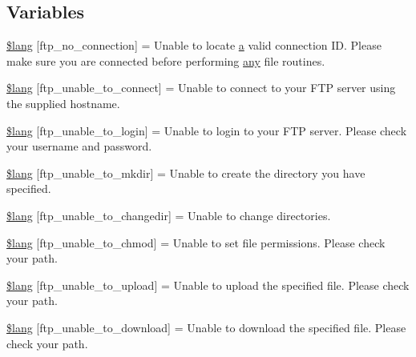 \subsection*{Variables}
\begin{DoxyCompactItemize}
\item 
\mbox{\hyperlink{ftp__lang_8php_af32ae700eb8c6446a6b393f025207123}{\$lang}} \mbox{[}\textquotesingle{}ftp\+\_\+no\+\_\+connection\textquotesingle{}\mbox{]} = \textquotesingle{}Unable to locate \mbox{\hyperlink{interfacea}{a}} valid connection I\+D. Please make sure you are connected before performing \mbox{\hyperlink{_functions_8php_aa950afcee01981fe0485ce00ff0e8e8c}{any}} file routines.\textquotesingle{}
\item 
\mbox{\hyperlink{ftp__lang_8php_a5a2916d207a12fc234432617f6bfe16c}{\$lang}} \mbox{[}\textquotesingle{}ftp\+\_\+unable\+\_\+to\+\_\+connect\textquotesingle{}\mbox{]} = \textquotesingle{}Unable to connect to your F\+TP server using the supplied hostname.\textquotesingle{}
\item 
\mbox{\hyperlink{ftp__lang_8php_ab8accd066e5113d6964f8a66bffadd2b}{\$lang}} \mbox{[}\textquotesingle{}ftp\+\_\+unable\+\_\+to\+\_\+login\textquotesingle{}\mbox{]} = \textquotesingle{}Unable to login to your F\+TP server. Please check your username and password.\textquotesingle{}
\item 
\mbox{\hyperlink{ftp__lang_8php_a1b9aef89edd203147bc526cad9cce4bf}{\$lang}} \mbox{[}\textquotesingle{}ftp\+\_\+unable\+\_\+to\+\_\+mkdir\textquotesingle{}\mbox{]} = \textquotesingle{}Unable to create the directory you have specified.\textquotesingle{}
\item 
\mbox{\hyperlink{ftp__lang_8php_a992dca1be963ab5d3ba070bfc2cd1cd3}{\$lang}} \mbox{[}\textquotesingle{}ftp\+\_\+unable\+\_\+to\+\_\+changedir\textquotesingle{}\mbox{]} = \textquotesingle{}Unable to change directories.\textquotesingle{}
\item 
\mbox{\hyperlink{ftp__lang_8php_a3329c4f515930936620f39a213dd3686}{\$lang}} \mbox{[}\textquotesingle{}ftp\+\_\+unable\+\_\+to\+\_\+chmod\textquotesingle{}\mbox{]} = \textquotesingle{}Unable to set file permissions. Please check your path.\textquotesingle{}
\item 
\mbox{\hyperlink{ftp__lang_8php_ae1f02f1304d517603128c96c70b7209b}{\$lang}} \mbox{[}\textquotesingle{}ftp\+\_\+unable\+\_\+to\+\_\+upload\textquotesingle{}\mbox{]} = \textquotesingle{}Unable to upload the specified file. Please check your path.\textquotesingle{}
\item 
\mbox{\hyperlink{ftp__lang_8php_ab5260548d1d2c2964dd03977903aff36}{\$lang}} \mbox{[}\textquotesingle{}ftp\+\_\+unable\+\_\+to\+\_\+download\textquotesingle{}\mbox{]} = \textquotesingle{}Unable to download the specified file. Please check your path.\textquotesingle{}

\end{DoxyCompactItemize}
